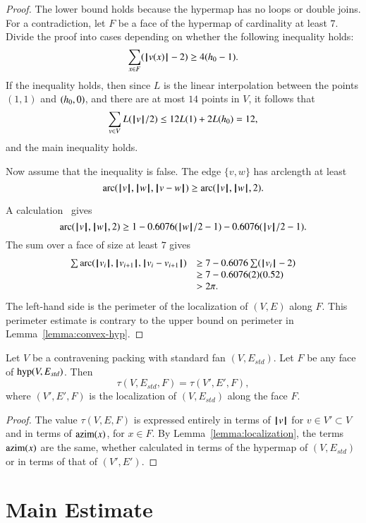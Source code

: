 \begin{proof} The lower bound holds because the hypermap has no loops or double joins.  For a contradiction, let $F$ be a face of the hypermap of cardinality at least $7$.  Divide the proof into cases depending on whether the
following inequality holds:
$$
\sum _{x\in F} (\normo{v(x)}-2) \ge 4(\hm-1).
$$
If the inequality holds, then since $L$ is the linear interpolation between the points $(1,1)$ and $(\hm,0)$, and there are at most $14$ points in $V$, it follows that
$$\sum_{v\in V}L(\normo{v}/2) \le 12 L(1) + 2 L(\hm) =12,$$
and the main inequality holds.

Now assume that the inequality is false.
The edge $\{v,w\}$ has arclength at least
$$
\arc(\normo{v},\normo{w},\norm{v}{w}) \ge \arc(\normo{v},\normo{w},2). 
$$

A calculation~\cite[cc:arc]{hales:2009:nonlinear} gives
$$\arc(\normo{v},\normo{w},2)\ge 1 - 0.6076 (\normo{w}/2 - 1) - 0.6076 (\normo{v}/2 - 1).$$ %
The sum over a face of size at least $7$ gives
$$
\begin{array}{lll}
\sum \arc(\normo{v_i},\normo{v_{i+1}},\norm{v_i}{v_{i+1}})&\ge
7 - 0.6076 \sum (\normo{v_i}-2) \\
   &\ge 7 - 0.6076 (2) (0.52) \\
   &> 2\pi.
\end{array}
$$
The left-hand side is the perimeter of the localization of $(V,E)$ along $F$.
This perimeter estimate is contrary to the upper bound on perimeter in Lemma~\ref{lemma:convex-hyp}.
\end{proof}

\begin{lemma}  Let $V$ be a contravening packing with
standard fan $(V,E_{std})$.  Let $F$ be any face of $\op{hyp}(V,E_{std})$.  Then
$$
\tau(V,E_{std},F) = \tau(V',E',F),
$$
where $(V',E',F)$ is the localization of $(V,E_{std})$ along the face $F$.
\end{lemma}

\begin{proof}  The value $\tau(V,E,F)$ is expressed entirely in terms of $\normo{v}$ for $v\in V'\subset V$ and in terms of $\op{azim}(x)$, for $x\in F$.  By Lemma~\ref{lemma:localization}, the terms $\op{azim}(x)$ are the same, whether calculated in terms of the hypermap of $(V,E_{std})$ or in terms of that of $(V',E')$. 
\end{proof}


\section{Main Estimate}\label{sec:weight}  


